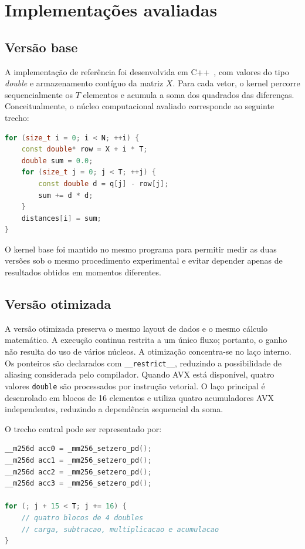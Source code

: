 \documentclass[11pt,a4paper]{article}
\begin{document}
\section{Implementações avaliadas}

\subsection{Versão base}
A implementação de referência foi desenvolvida em C++~\cite{schildt1998cpp}, com valores do tipo \textit{double} e armazenamento contíguo da matriz $X$. Para cada vetor, o kernel percorre sequencialmente os $T$ elementos e acumula a soma dos quadrados das diferenças. Conceitualmente, o núcleo computacional avaliado corresponde ao seguinte trecho:
\\
\begin{lstlisting}[language=C++, linewidth=0.80\textwidth, xleftmargin=0.20\textwidth]
for (size_t i = 0; i < N; ++i) {
    const double* row = X + i * T;
    double sum = 0.0;
    for (size_t j = 0; j < T; ++j) {
        const double d = q[j] - row[j];
        sum += d * d;
    }
    distances[i] = sum;
}
\end{lstlisting}

O kernel base foi mantido no mesmo programa para permitir medir as duas versões sob o mesmo procedimento experimental e evitar depender apenas de resultados obtidos em momentos diferentes.

\subsection{Versão otimizada}
A versão otimizada preserva o mesmo layout de dados e o mesmo cálculo matemático. A execução continua restrita a um único fluxo; portanto, o ganho não resulta do uso de vários núcleos. A otimização concentra-se no laço interno. Os ponteiros são declarados com \texttt{\_\_restrict\_\_}, reduzindo a possibilidade de aliasing considerada pelo compilador. Quando AVX está disponível, quatro valores \texttt{double} são processados por instrução vetorial. O laço principal é desenrolado em blocos de 16 elementos e utiliza quatro acumuladores AVX independentes, reduzindo a dependência sequencial da soma.

O trecho central pode ser representado por:

\begin{lstlisting}[language=C++, linewidth=0.80\textwidth, xleftmargin=0.20\textwidth]
__m256d acc0 = _mm256_setzero_pd();
__m256d acc1 = _mm256_setzero_pd();
__m256d acc2 = _mm256_setzero_pd();
__m256d acc3 = _mm256_setzero_pd();

for (; j + 15 < T; j += 16) {
    // quatro blocos de 4 doubles
    // carga, subtracao, multiplicacao e acumulacao
}
\end{lstlisting}
\end{document}
